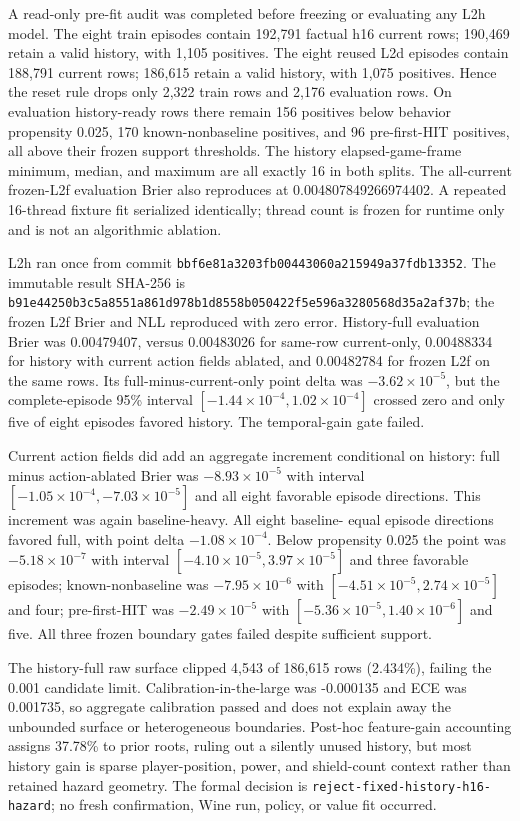 \documentclass[11pt]{article}
\begin{document}
A read-only pre-fit audit was completed before freezing or evaluating any L2h
model.  The eight train episodes contain 192,791 factual h16 current rows;
190,469 retain a valid history, with 1,105 positives.  The eight reused L2d
episodes contain 188,791 current rows; 186,615 retain a valid history, with
1,075 positives.  Hence the reset rule drops only 2,322 train rows and 2,176
evaluation rows.  On evaluation history-ready rows there remain 156 positives
below behavior propensity 0.025, 170 known-nonbaseline positives, and 96
pre-first-HIT positives, all above their frozen support thresholds.  The
history elapsed-game-frame minimum, median, and maximum are all exactly 16 in
both splits.  The all-current frozen-L2f evaluation Brier also reproduces at
0.004807849266974402.  A repeated 16-thread fixture fit serialized identically;
thread count is frozen for runtime only and is not an algorithmic ablation.

L2h ran once from commit
\texttt{bbf6e81a3203fb00443060a215949a37fdb13352}.  The immutable result
SHA-256 is
\texttt{b91e44250b3c5a8551a861d978b1d8558b050422f5e596a3280568d35a2af37b};
the frozen L2f Brier and NLL reproduced with zero error.  History-full
evaluation Brier was 0.00479407, versus 0.00483026 for same-row current-only,
0.00488334 for history with current action fields ablated, and 0.00482784 for
frozen L2f on the same rows.  Its full-minus-current-only point delta was
$-3.62\times10^{-5}$, but the complete-episode 95\% interval
$[-1.44\times10^{-4},1.02\times10^{-4}]$ crossed zero and only five of eight
episodes favored history.  The temporal-gain gate failed.

Current action fields did add an aggregate increment conditional on history:
full minus action-ablated Brier was $-8.93\times10^{-5}$ with interval
$[-1.05\times10^{-4},-7.03\times10^{-5}]$ and all eight favorable episode
directions.  This increment was again baseline-heavy.  All eight baseline-
equal episode directions favored full, with point delta
$-1.08\times10^{-4}$.  Below propensity 0.025 the point was
$-5.18\times10^{-7}$ with interval
$[-4.10\times10^{-5},3.97\times10^{-5}]$ and three favorable episodes;
known-nonbaseline was $-7.95\times10^{-6}$ with
$[-4.51\times10^{-5},2.74\times10^{-5}]$ and four; pre-first-HIT was
$-2.49\times10^{-5}$ with
$[-5.36\times10^{-5},1.40\times10^{-6}]$ and five.  All three frozen boundary
gates failed despite sufficient support.

The history-full raw surface clipped 4,543 of 186,615 rows (2.434\%), failing
the 0.001 candidate limit.  Calibration-in-the-large was -0.000135 and ECE was
0.001735, so aggregate calibration passed and does not explain away the
unbounded surface or heterogeneous boundaries.  Post-hoc feature-gain
accounting assigns 37.78\% to prior roots, ruling out a silently unused history,
but most history gain is sparse player-position, power, and shield-count
context rather than retained hazard geometry.  The formal decision is
\texttt{reject-fixed-history-h16-hazard}; no fresh confirmation, Wine run,
policy, or value fit occurred.
\end{document}
